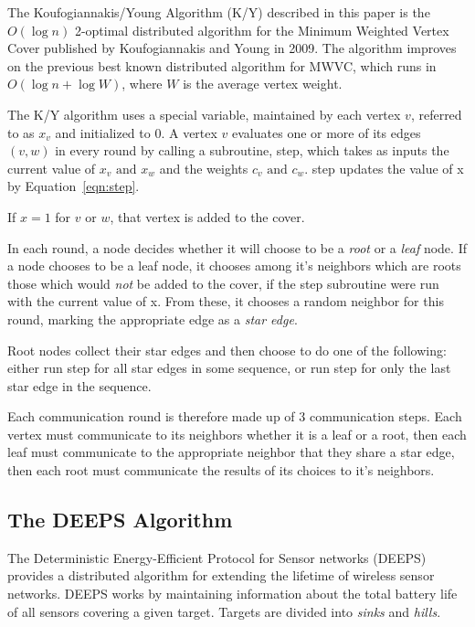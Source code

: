 The Koufogiannakis/Young Algorithm (K/Y) described in this paper is the $O(\log n)$ 2-optimal distributed algorithm for the Minimum Weighted Vertex Cover published by Koufogiannakis and Young in 2009\cite{1582746}. The algorithm improves on the previous best known distributed algorithm for MWVC, which runs in $O(\log n + \log W)$, where  $W$ is the average vertex weight\cite{1435381}.

The K/Y algorithm uses a special variable, maintained by each vertex $v$, referred to as $x_v$ and initialized to 0. A vertex $v$ evaluates one or more of its edges $(v, w)$ in every round by calling a subroutine, {\ttfamily step}, which takes as inputs the current value of $x_v \text{ and } x_w$ and the weights $c_v \text{ and } c_w$. {\ttfamily step} updates the value of x by Equation~\ref{eqn:step}.



If $x = 1 $ for $v \text{ or } w$, that vertex is added to the cover.

In each round, a node decides whether it will choose to be a {\em root} or a {\em leaf} node. If a node chooses to be a leaf node, it chooses among it's neighbors which are roots those which would {\em not} be added to the cover, if the {\ttfamily step} subroutine were run with the current value of x. From these, it chooses a random neighbor for this round, marking the appropriate edge as a {\em star edge}.

Root nodes collect their star edges and then choose to do one of the following: either run {\ttfamily step} for all star edges in some sequence, or run {\ttfamily step} for only the last star edge in the sequence. 

Each communication round is therefore made up of 3 communication steps. Each vertex must communicate to its neighbors whether it is a leaf or a root, then each leaf must communicate to the appropriate neighbor that they share a star edge, then each root must communicate the results of its choices to it's neighbors.


\subsection{The DEEPS Algorithm}
\label{sec:deeps}

The Deterministic Energy-Efficient Protocol for Sensor networks (DEEPS) provides a distributed algorithm for extending the lifetime of wireless sensor networks\cite{1640702}. DEEPS works by maintaining information about the total battery life of all sensors covering a given target. Targets are divided into {\em sinks} and {\em hills}. 

